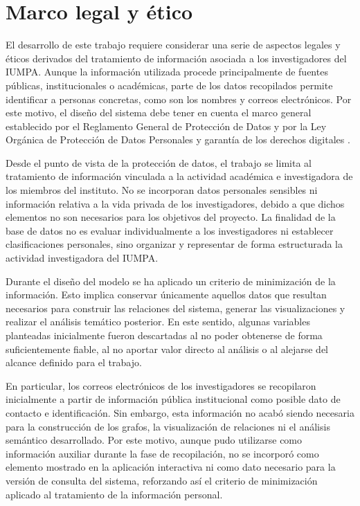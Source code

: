 \documentclass[11pt,spanish,listoffigures,listoftables]{tfgetsinf}
\begin{document}
\section{Marco legal y ético}

El desarrollo de este trabajo requiere considerar una serie de aspectos legales y éticos derivados del tratamiento de información asociada a los investigadores del IUMPA. Aunque la información utilizada procede principalmente de fuentes públicas, institucionales o académicas, parte de los datos recopilados permite identificar a personas concretas, como son los nombres y correos electrónicos. Por este motivo, el diseño del sistema debe tener en cuenta el marco general establecido por el Reglamento General de Protección de Datos y por la Ley Orgánica de Protección de Datos Personales y garantía de los derechos digitales \cite{RGPD2016,LOPDGDD2018}.

Desde el punto de vista de la protección de datos, el trabajo se limita al tratamiento de información vinculada a la actividad académica e investigadora de los miembros del instituto. No se incorporan datos personales sensibles ni información relativa a la vida privada de los investigadores, debido a que dichos elementos no son necesarios para los objetivos del proyecto. La finalidad de la base de datos no es evaluar individualmente a los investigadores ni establecer clasificaciones personales, sino organizar y representar de forma estructurada la actividad investigadora del IUMPA.

Durante el diseño del modelo se ha aplicado un criterio de minimización de la información. Esto implica conservar únicamente aquellos datos que resultan necesarios para construir las relaciones del sistema, generar las visualizaciones y realizar el análisis temático posterior. En este sentido, algunas variables planteadas inicialmente fueron descartadas al no poder obtenerse de forma suficientemente fiable, al no aportar valor directo al análisis o al alejarse del alcance definido para el trabajo.

En particular, los correos electrónicos de los investigadores se recopilaron inicialmente a partir de información pública institucional como posible dato de contacto e identificación. Sin embargo, esta información no acabó siendo necesaria para la construcción de los grafos, la visualización de relaciones ni el análisis semántico desarrollado. Por este motivo, aunque pudo utilizarse como información auxiliar durante la fase de recopilación, no se incorporó como elemento mostrado en la aplicación interactiva ni como dato necesario para la versión de consulta del sistema, reforzando así el criterio de minimización aplicado al tratamiento de la información personal.
\end{document}

